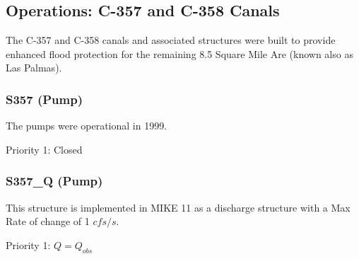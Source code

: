 

\clearpage
\subsection{Operations: C-357 and C-358 Canals}
The C-357 and C-358 canals and associated structures were built to provide enhanced flood protection for the remaining 8.5 Square Mile Are (known also as Las Palmas).

\subsubsection{S357  (Pump)}
The pumps were operational in 1999.

\begin{packed_items}
\item Priority 1: Closed
\end{packed_items}

\clearpage
\subsubsection{S357\_Q (Pump)}
This structure is implemented in MIKE 11 as a discharge structure with a Max Rate of change of 1 $cfs/s$.
\begin{packed_items}
\item Priority 1: $Q = Q_{obs}$
\end{packed_items}

